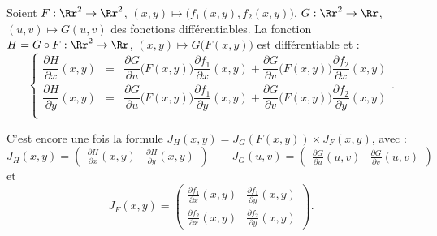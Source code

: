 \documentclass[11pt, class=report,crop=false]{standalone}
\begin{document}
%
%
%
%

\bigskip


\begin{proposition}
Soient $F : \Rr^2 \to \Rr^2$, $(x,y) \mapsto \big(f_1(x,y),f_2(x,y) \big)$, $G : \Rr^2 \to \Rr$,
$(u,v) \mapsto G(u,v)$ des fonctions différentiables.
La fonction $H = G \circ F : \Rr^2 \to \Rr$, $(x,y) \mapsto G \big( F(x,y) \big)$ est différentiable et :
$$\left\{\begin{array}{rcl}
\dfrac{\partial H}{\partial x}(x,y) &=& 
\dfrac{\partial G}{\partial u}\big( F(x,y) \big) \dfrac{\partial f_1}{\partial x}(x,y)+
\dfrac{\partial G}{\partial v}\big( F(x,y) \big) \dfrac{\partial f_2}{\partial x}(x,y) \\[3ex]
\dfrac{\partial H}{\partial y}(x,y) &=& 
\dfrac{\partial G}{\partial u}\big( F(x,y) \big) \dfrac{\partial f_1}{\partial y}(x,y)+
\dfrac{\partial G}{\partial v}\big( F(x,y) \big) \dfrac{\partial f_2}{\partial y}(x,y) \\
\end{array}\right..
$$
\end{proposition}

C'est encore une fois la formule $J_H (x,y) = J_G ( F(x,y) ) \times J_F (x,y)$, avec :
$$
J_H(x,y) = \begin{pmatrix} \frac{\partial H}{\partial x}(x,y)
&  \frac{\partial H}{\partial y}(x,y) \end{pmatrix} \qquad
J_G(u,v) = \begin{pmatrix} \frac{\partial G}{\partial u}(u,v)
&  \frac{\partial G}{\partial v}(u,v) \end{pmatrix}$$
et 
$$
J_F(x,y) = \begin{pmatrix} 
\frac{\partial f_1}{\partial x}(x,y) &  \frac{\partial f_1}{\partial y}(x,y) \\
\frac{\partial f_2}{\partial x}(x,y) &  \frac{\partial f_2}{\partial y}(x,y) 
\end{pmatrix}.
$$
\end{document}
